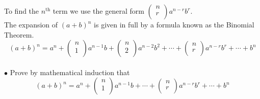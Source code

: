 \documentclass[11pt,a4paper]{article}
\begin{document}
To find the $n^{\text{th}}$ term we use the general form $
\begin{pmatrix}
n\\r\\
\end{pmatrix}
a^{n-r}b^r
$.\\
The expansion of $(a+b)^n$ is given in full by a formula known as the Binomial Theorem.
$$(a+b)^n=a^n+
\begin{pmatrix}
n\\1\\
\end{pmatrix}
a^{n-1}b+
\begin{pmatrix}
n\\2\\
\end{pmatrix}
a^{n-2}b^2+\cdots +
\begin{pmatrix}
n\\r\\
\end{pmatrix}
a^{n-r}b^r+\cdots +b^n
$$\\

$\bullet$ Prove by mathematical induction that $$(a+b)^n=a^n+
\begin{pmatrix}
n\\1\\
\end{pmatrix}
a^{n-1}b+\cdots +
\begin{pmatrix}
n\\r\\
\end{pmatrix}
a^{n-r}b^r+\cdots +b^n
$$
\end{document}
